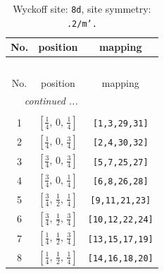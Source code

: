 \documentclass[fleqn,8pt]{jsarticle}
\begin{document}
\begin{longtable}{ccc}
\caption{Wyckoff site: {\tt 8d}, site symmetry: {\tt .2/m'.}}
 \\
 \hline \hline
No. & position & mapping \\ \hline \endfirsthead

\multicolumn{2}{l}{\tablename\ \thetable{}} \\
 \hline \hline
No. & position & mapping \\ \hline \endhead

 \hline \hline
\multicolumn{2}{r}{\footnotesize\it continued ...} \\ \endfoot

 \hline \hline
\multicolumn{2}{r}{} \\ \endlastfoot

1 & $\left[ \frac{1}{4},\, 0,\, \frac{1}{4} \right]$ & {\tt [1,3,29,31]} \\ \hline
2 & $\left[ \frac{1}{4},\, 0,\, \frac{3}{4} \right]$ & {\tt [2,4,30,32]} \\ \hline
3 & $\left[ \frac{3}{4},\, 0,\, \frac{3}{4} \right]$ & {\tt [5,7,25,27]} \\ \hline
4 & $\left[ \frac{3}{4},\, 0,\, \frac{1}{4} \right]$ & {\tt [6,8,26,28]} \\ \hline
5 & $\left[ \frac{3}{4},\, \frac{1}{2},\, \frac{1}{4} \right]$ & {\tt [9,11,21,23]} \\ \hline
6 & $\left[ \frac{3}{4},\, \frac{1}{2},\, \frac{3}{4} \right]$ & {\tt [10,12,22,24]} \\ \hline
7 & $\left[ \frac{1}{4},\, \frac{1}{2},\, \frac{3}{4} \right]$ & {\tt [13,15,17,19]} \\ \hline
8 & $\left[ \frac{1}{4},\, \frac{1}{2},\, \frac{1}{4} \right]$ & {\tt [14,16,18,20]} \\
\end{longtable}
\renewcommand{\arraystretch}{1.2}
\end{document}
